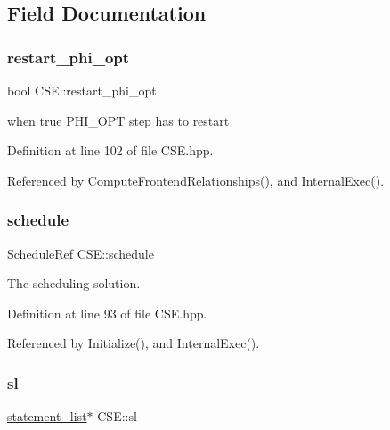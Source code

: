 \subsection{Field Documentation}
\mbox{\label{classCSE_aa626fd33f0c12bb38a156f1911131fc6}} 
\subsubsection{\texorpdfstring{restart\+\_\+phi\+\_\+opt}{restart\_phi\_opt}}
{\footnotesize\ttfamily bool C\+S\+E\+::restart\+\_\+phi\+\_\+opt\hspace{0.3cm}{\ttfamily [private]}}



when true P\+H\+I\+\_\+\+O\+PT step has to restart 



Definition at line 102 of file C\+S\+E.\+hpp.



Referenced by Compute\+Frontend\+Relationships(), and Internal\+Exec().

\mbox{\label{classCSE_a71e05ccfa2a25a5c2d8d87f19d5fc2b5}} 
\subsubsection{\texorpdfstring{schedule}{schedule}}
{\footnotesize\ttfamily \hyperlink{schedule_8hpp_af67f402958b3b52a1ec5cc4ce08ae3b9}{Schedule\+Ref} C\+S\+E\+::schedule\hspace{0.3cm}{\ttfamily [private]}}



The scheduling solution. 



Definition at line 93 of file C\+S\+E.\+hpp.



Referenced by Initialize(), and Internal\+Exec().

\mbox{\label{classCSE_a0548b738f81f709d2c781cac84c3dd7f}} 
\subsubsection{\texorpdfstring{sl}{sl}}
{\footnotesize\ttfamily \hyperlink{structstatement__list}{statement\+\_\+list}$\ast$ C\+S\+E\+::sl\hspace{0.3cm}{\ttfamily [private]}}



